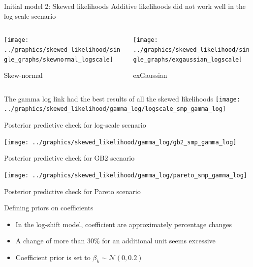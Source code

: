 \begin{frame}{Initial model 2: Skewed likelihoods}
    Additive likelihoods did not work well in the log-scale scenario

    \begin{columns}
        \begin{column}{0.49\textwidth}
            \centering
            \texttt{[image: ../graphics/skewed\_likelihood/single\_graphs/skewnormal\_logscale]}

            Skew-normal
        \end{column}

        \begin{column}{0.49\textwidth}
            \centering
            \texttt{[image: ../graphics/skewed\_likelihood/single\_graphs/exgaussian\_logscale]}

            exGaussian
        \end{column}
    \end{columns}

\end{frame}

\begin{frame}
    \vspace{-0.5cm}
    \scriptsize{The gamma log link had the best results of all the skewed likelihoods}
    \centering
    \texttt{[image: ../graphics/skewed\_likelihood/gamma\_log/logscale\_smp\_gamma\_log]}

    \scriptsize{Posterior predictive check for log-scale scenario}

    \texttt{[image: ../graphics/skewed\_likelihood/gamma\_log/gb2\_smp\_gamma\_log]}

    \scriptsize{Posterior predictive check for GB2 scenario}

    \texttt{[image: ../graphics/skewed\_likelihood/gamma\_log/pareto\_smp\_gamma\_log]}

    \scriptsize{Posterior predictive check for Pareto scenario}

\end{frame}

\begin{frame}{Defining priors on coefficients}
    \begin{itemize}
        \item In the log-shift model, coefficient are approximately percentage changes
        \item A change of more than 30\% for an additional unit seems excessive
        \item Coefficient prior is set to $\beta_k \sim \mathcal N(0, 0.2)$
    \end{itemize}
\end{frame}

